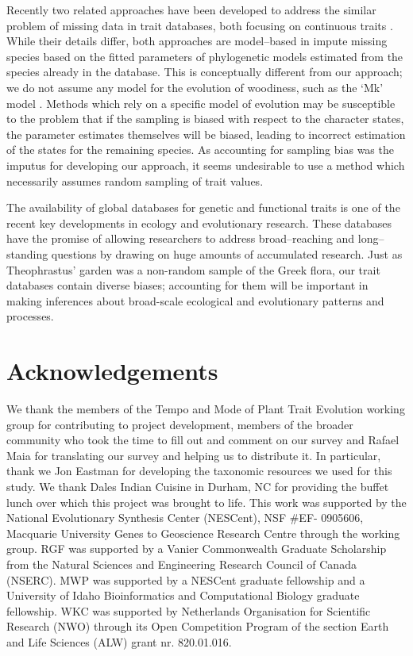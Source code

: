 \documentclass[a4paper,12pt]{article}
\begin{document}
Recently two related approaches have been developed to address the similar problem
of missing data in trait databases, both focusing on continuous traits \citep{Swenson2013, PEM}. 
While their details differ, both approaches are model--based in impute missing species
based on the fitted parameters of
phylogenetic models estimated from
the species already in the database. This is conceptually different from our approach;
we do not assume any model for the evolution of woodiness, such as the `Mk' model \citep{Pagel1994}.
Methods which rely on a specific model
of evolution may be susceptible to the problem that if the sampling is biased with respect
to the character states, the parameter estimates themselves will be biased, leading 
to incorrect estimation of the states for the remaining species. As accounting for sampling bias
was the imputus for developing our approach, it seems undesirable to use
a method which necessarily assumes random sampling of trait values.

The availability of global databases for genetic and functional traits is one of the recent key developments in ecology and evolutionary research. 
 These databases have the promise of allowing researchers to address broad--reaching and 
long--standing questions by drawing on huge amounts of accumulated research.  
Just as Theophrastus' garden was a non-random sample of the Greek
flora, our trait databases contain diverse biases; accounting for
them will be important in making inferences about broad-scale
ecological and evolutionary patterns and processes.

\section{Acknowledgements}

We thank the members of the Tempo and Mode of Plant Trait
Evolution working group for contributing to project development,
members of the broader community who took the time to fill out and
comment on our survey and Rafael Maia for translating our survey and
helping us to distribute it.  In particular, thank we Jon Eastman for 
developing the taxonomic resources we used for this study.
%
We thank Dales Indian Cuisine in Durham, NC for providing the buffet
lunch over which this project was brought to life.
%
This work was supported by the National Evolutionary Synthesis Center
(NESCent), NSF \#EF- 0905606, Macquarie University Genes to Geoscience
Research Centre through the working group.
%
RGF was supported by a Vanier Commonwealth Graduate Scholarship from
the Natural Sciences and Engineering Research Council of Canada
(NSERC).
MWP was supported by a NESCent graduate fellowship and a 
University of Idaho Bioinformatics and Computational Biology graduate fellowship.
%
WKC was supported by Netherlands Organisation for
Scientific Research (NWO) through its Open Competition Program of the
section Earth and Life Sciences (ALW) grant nr. 820.01.016.
\end{document}

